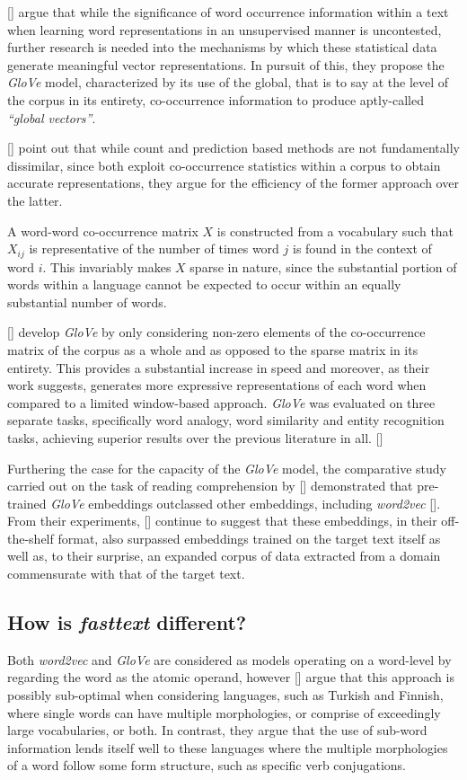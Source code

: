 \documentclass[12pt, a4paper]{report}
\theoremstyle{definition}
\theoremstyle{definition}%
\theoremstyle{definition}%
\theoremstyle{definition}%
\theoremstyle{definition}%
\theoremstyle{definition}%
\renewcommand{\cite}[1]{[\citealp{#1}]}
\begin{document}
\cite{pennington} argue that while the significance of word occurrence information within a text when learning word representations in an unsupervised manner is uncontested, further research is needed into the mechanisms by which these statistical data generate meaningful vector representations. In pursuit of this, they propose the \textit{GloVe} model, characterized by its use of the global, that is to say at the level of the corpus in its entirety, co-occurrence information to produce aptly-called \textit{\enquote{global vectors}}.

\cite{pennington} point out that while count and prediction based methods are not fundamentally dissimilar, since both exploit co-occurrence statistics within a corpus to obtain accurate representations, they argue for the efficiency of the former approach over the latter.

A word-word co-occurrence matrix $X$ is constructed from a vocabulary such that $X_{ij}$ is representative of the number of times word $j$ is found in the context of word $i$. This invariably makes $X$ sparse in nature, since the substantial portion of words within a language cannot be expected to occur within an equally substantial number of words.

\cite{pennington} develop \textit{GloVe} by only considering non-zero elements of the co-occurrence matrix of the corpus as a whole and as opposed to the sparse matrix in its entirety. This provides a substantial increase in speed and moreover, as their work suggests, generates more expressive representations of each word when compared to a limited window-based approach. \textit{GloVe} was evaluated on three separate tasks, specifically word analogy, word similarity and entity recognition tasks, achieving superior results over the previous literature in all. \cite{pennington}

Furthering the case for the capacity of the \textit{GloVe} model, the comparative study carried out on the task of reading comprehension by \cite{bhuwandhingra2017} demonstrated that pre-trained \textit{GloVe} embeddings outclassed other embeddings, including \textit{word2vec} \cite{mikolov2013}. From their experiments, \cite{bhuwandhingra2017} continue to suggest that these embeddings, in their off-the-shelf format, also surpassed embeddings trained on the target text itself as well as, to their surprise, an expanded corpus of data extracted from a domain commensurate with that of the target text.

\subsection{How is \textit{fasttext} different?}
Both \textit{word2vec} and \textit{GloVe} are considered as models operating on a word-level by regarding the word as the atomic operand, however \cite{bojanowski2017} argue that this approach is possibly sub-optimal when considering languages, such as Turkish and Finnish, where single words can have multiple morphologies, or comprise of exceedingly large vocabularies, or both. In contrast, they argue that the use of sub-word information lends itself well to these languages where the multiple morphologies of a word follow some form structure, such as specific verb conjugations.
\end{document}
